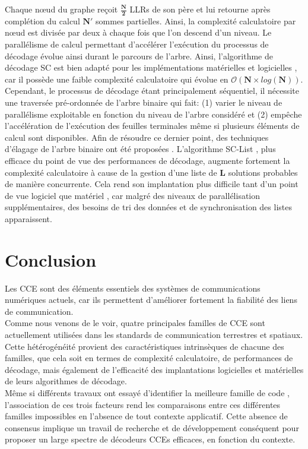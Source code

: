 \documentclass[../main.tex]{subfiles}
\begin{document}
Chaque nœud du graphe reçoit $\bm{\frac{N}{2}}$ LLRs de son père et lui retourne après complétion du calcul $\bm{N'}$ sommes partielles.
Ainsi, la complexité calculatoire par nœud est divisée par deux à chaque fois que l’on descend d’un niveau. Le parallélisme de calcul permettant d’accélérer l’exécution du processus de décodage évolue ainsi durant le parcours de l’arbre.
Ainsi, l’algorithme de décodage SC est bien adapté pour les implémentations matérielles \cite{88, 89, 90, 91, 92, 93} et logicielles \cite{PC:X1, ri:LeG15a, PC:X3}, car il possède une faible complexité calculatoire qui évolue en $\mathcal{O}(\bm{N} \times log(\bm{N}))$.
Cependant, le processus de décodage étant principalement séquentiel, il nécessite une traversée pré-ordonnée de l’arbre binaire \cite{100} qui fait: (1) varier le niveau de parallélisme exploitable en fonction du niveau de l’arbre considéré et (2) empêche l’accélération de l’exécution des feuilles terminales même si plusieurs éléments de calcul sont disponibles.
Afin de résoudre ce dernier point, des techniques d’élagage de l’arbre binaire ont été proposées \cite{PC:prune}.
L’algorithme SC-List \cite{these_yann}, plus efficace du point de vue des performances de décodage, augmente fortement la complexité calculatoire à cause de la gestion d’une liste de \textbf{L} solutions probables de manière concurrente. Cela rend son implantation plus difficile tant d’un point de vue logiciel \cite{Leonardon:2019vf, SCL:X2} que matériel \cite{these_yann}, car malgré des niveaux de parallélisation supplémentaires, des besoins de tri des données et de synchronisation des listes apparaissent. 
% 
% 
% 
% 
% 
\section{Conclusion}
% 
% 
% 
% 
% 
Les CCE sont des éléments essentiels des systèmes de communications numériques actuels, car ils permettent d’améliorer fortement la fiabilité des liens de communication. \\
Comme nous venons de le voir, quatre principales familles de CCE sont actuellement utilisées dans les standards de communication terrestres et spatiaux. Cette hétérogénéité provient des caractéristiques intrinsèques de chacune des familles, que cela soit en termes de complexité calculatoire, de performances de décodage, mais également de l’efficacité des implantations logicielles et matérielles de leurs algorithmes de décodage.\\
Même si différents travaux ont essayé d’identifier la meilleure famille de code \cite{R1, R2, R3}, l’association de ces trois facteurs rend les comparaisons entre ces différentes familles impossibles en l’absence de tout contexte applicatif. Cette absence de consensus implique un travail de recherche et de développement conséquent pour proposer un large spectre de décodeurs CCEs efficaces, en fonction du contexte.
\end{document}
